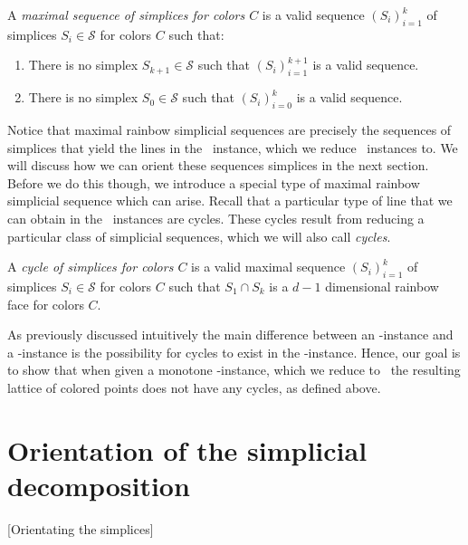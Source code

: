 \begin{definition}
	A \emph{maximal sequence of simplices for colors $C$} is a valid sequence ${\left(S_i\right)}_{i=1}^{k}$ of simplices $S_i \in \mathcal{S}$ for colors $C$ such that:
	\begin{enumerate}
		\item There is no simplex $S_{k+1} \in \mathcal{S}$ such that ${\left(S_i\right)}_{i=1}^{k+1}$ is a valid sequence.
		\item There is no simplex $S_{0} \in \mathcal{S}$ such that ${\left(S_i\right)}_{i=0}^{k}$ is a valid sequence.
	\end{enumerate}
\end{definition}

Notice that maximal rainbow simplicial sequences are precisely the sequences of simplices that yield the lines in the \EndOfLine\ instance, which we reduce \Sperner\ instances to. We will discuss how we can orient these sequences simplices in the next section. Before we do this though, we introduce a special type of maximal rainbow simplicial sequence which can arise. Recall that a particular type of line that we can obtain in the \EndOfLine\ instances are cycles. These cycles result from reducing a particular class of simplicial sequences, which we will also call \emph{cycles}.

\begin{definition}[Cycle]
	A \emph{cycle of simplices for colors $C$} is a valid maximal sequence ${\left(S_i\right)}_{i=1}^{k}$ of simplices $S_i \in \mathcal{S}$ for colors $C$ such that $S_1 \cap S_k$ is a $d-1$ dimensional rainbow face for colors $C$.
\end{definition}

As previously discussed intuitively the main difference between an \EndOfLine-instance and a \EndOfPotentialLine-instance is the possibility for cycles to exist in the \EndOfLine-instance. Hence, our goal is to show that when given a monotone \Tarskistar-instance, which we reduce to \Sperner\ the resulting lattice of colored points does not have any cycles, as defined above.

\section{Orientation of the simplicial decomposition}[Orientating the simplices]

